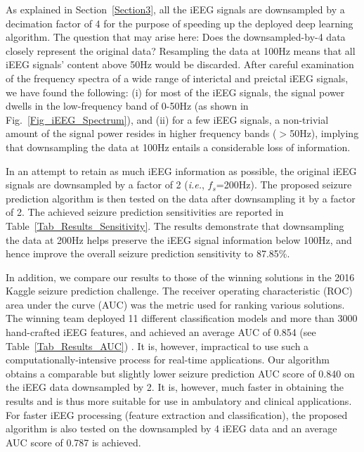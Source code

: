 \documentclass[journal]{IEEEtran}
\begin{document}
As explained in Section~\ref{Section3}, all the iEEG signals are downsampled by a decimation factor of 4 for the purpose of speeding up the deployed deep learning algorithm. The question that may arise here: Does the downsampled-by-4 data closely represent the original data? 
Resampling the data at 100Hz means that all iEEG signals' content above 50Hz would be discarded. After careful examination of the frequency spectra of a wide range of interictal and preictal iEEG signals, we have found the following: (i) for most of the iEEG signals, the signal power dwells in the low-frequency band of 0-50Hz (as shown in Fig.~\ref{Fig_iEEG_Spectrum}), and (ii) for a few iEEG signals, a non-trivial amount of the signal power resides in higher frequency bands ($>$50Hz), implying that downsampling the data at 100Hz entails a considerable loss of information.  

In an attempt to retain as much iEEG information as possible, the original iEEG signals are downsampled by a factor of 2 (\textit{i.e.}, $f_s$=200Hz). The proposed seizure prediction algorithm is then tested on the data after downsampling it by a factor of 2. The achieved seizure prediction sensitivities are reported in Table~\ref{Tab_Results_Sensitivity}. The results demonstrate that downsampling the data at 200Hz helps preserve the iEEG signal information below 100Hz, and hence improve the overall seizure prediction sensitivity to 87.85\%.   





In addition, we compare our results to those of the winning solutions in the 2016 Kaggle seizure prediction challenge. The receiver operating characteristic (ROC) area under the curve (AUC) was the metric used for ranking various solutions. The winning team deployed 11 different classification models and more than 3000 hand-crafted iEEG features, and achieved an average AUC of 0.854 (see Table~\ref{Tab_Results_AUC}) \cite{WinningSolution, kuhlmann2018epilepsyecosystem}. It is, however, impractical to use such a computationally-intensive process for real-time applications. Our algorithm obtains a comparable but slightly lower seizure prediction AUC score of 0.840 on the iEEG data downsampled by 2. It is, however, much faster in obtaining the results and is thus more suitable for use in ambulatory and clinical applications. 
For faster iEEG processing (feature extraction and classification), the proposed algorithm is also tested on the downsampled by 4 iEEG data and an average AUC score of 0.787 is achieved. 
\end{document}
